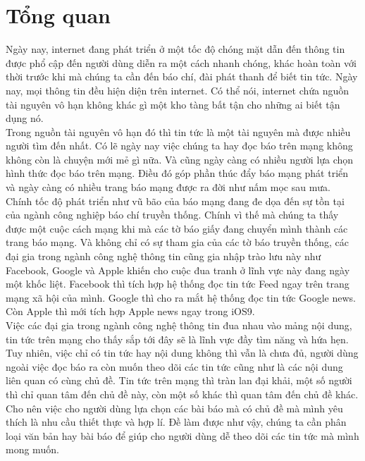 \chapter*{Tổng quan}
\label{Chapter0}

\hspace{10mm}Ngày nay, internet đang phát triển ở một tốc độ chóng mặt dẫn đến thông tin được phổ cập đến người dùng diễn ra một cách nhanh chóng, khác hoàn toàn với thời trước khi mà chúng ta cần đến báo chí, đài phát thanh để biết tin tức. Ngày nay, mọi thông tin đều hiện diện trên internet. Có thể nói, internet chứa nguồn tài nguyên vô hạn không khác gì một kho tàng bất tận cho những ai biết tận dụng nó. \\
\hspace*{10mm}Trong nguồn tài nguyên vô hạn đó thì tin tức là một tài nguyên mà được nhiều người tìm đến nhất. Có lẽ ngày nay việc chúng ta hay đọc báo trên mạng không không còn là chuyện mới mẻ gì nữa. Và cũng ngày càng có nhiều người lựa chọn hình thức đọc báo trên mạng. Điều đó góp phần thúc đẩy báo mạng phát triển và ngày càng có nhiều trang báo mạng được ra đời như nấm mọc sau mưa. \\
\hspace*{10mm}Chính tốc độ phát triển như vũ bão của báo mạng đang đe dọa đến sự tồn tại của ngành công nghiệp báo chí truyền thống. Chính vì thế mà chúng ta thấy được một cuộc cách mạng khi mà các tờ báo giấy đang chuyển mình thành các trang báo mạng. Và không chỉ có sự tham gia của các tờ báo truyền thống, các đại gia trong ngành công nghệ thông tin cũng gia nhập trào lưu này như Facebook, Google và Apple khiến cho cuộc đua tranh ở lĩnh vực này đang ngày một khốc liệt. Facebook thì tích hợp hệ thống đọc tin tức Feed ngay trên trang mạng xã hội của mình. Google thì cho ra mắt hệ thống đọc tin tức Google news. Còn Apple thì mới tích hợp Apple news ngay trong iOS\textunderscore{}9. \\
\hspace*{10mm}Việc các đại gia trong ngành công nghệ thông tin đua nhau vào mảng nội dung, tin tức trên mạng cho thấy sắp tới đây sẽ là lĩnh vực đầy tìm năng và hứa hẹn. Tuy nhiên, việc chỉ có tin tức hay nội dung không thì vẫn là chưa đủ, người dùng ngoài việc đọc báo ra còn muốn theo dõi các tin tức cũng như là các nội dung liên quan có cùng chủ đề. Tin tức trên mạng thì tràn lan đại khải, một số người thì chỉ quan tâm đến chủ đề này, còn một số khác thì quan tâm đến chủ đề khác. Cho nên việc cho người dùng lựa chọn các bài báo mà có chủ đề mà mình yêu thích là nhu cầu thiết thực và hợp lí. Đề làm được như vậy, chúng ta cần phân loại văn bản hay bài báo để giúp cho người dùng dễ theo dõi các tin tức mà mình mong muốn.\\
